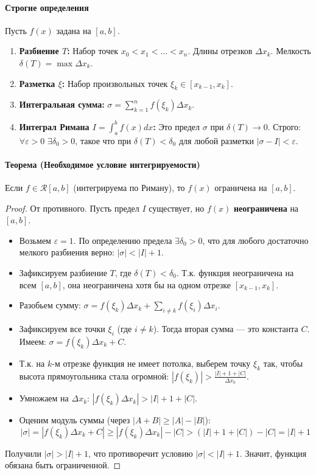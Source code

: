 \paragraph{Строгие определения}
Пусть $f(x)$ задана на $[a, b]$. 
\begin{enumerate}
    \item \textbf{Разбиение $T$:} Набор точек $x_0 < x_1 < \dots < x_n$. Длины отрезков $\Delta x_k$. Мелкость $\delta(T) = \max \Delta x_k$.
    \item \textbf{Разметка $\xi$:} Набор произвольных точек $\xi_k \in [x_{k-1}, x_k]$.
    \item \textbf{Интегральная сумма:} $\sigma = \sum_{k=1}^n f(\xi_k) \Delta x_k$.
    \item \textbf{Интеграл Римана $I = \int_a^b f(x) dx$:} Это предел $\sigma$ при $\delta(T) \to 0$. Строго: $\forall \varepsilon > 0 \,\, \exists \delta_0 > 0$, такое что при $\delta(T) < \delta_0$ для любой разметки $|\sigma - I| < \varepsilon$.
\end{enumerate}

\paragraph{Теорема (Необходимое условие интегрируемости)}
\begin{theorem}
Если $f \in \mathcal{R}[a, b]$ (интегрируема по Риману), то $f(x)$ ограничена на $[a, b]$.
\end{theorem}

\begin{proof}
От противного. Пусть предел $I$ существует, но $f(x)$ \textbf{неограничена} на $[a, b]$.
\begin{itemize}
    \item Возьмем $\varepsilon = 1$. По определению предела $\exists \delta_0 > 0$, что для любого достаточно мелкого разбиения верно: $|\sigma| < |I| + 1$.
    \item Зафиксируем разбиение $T$, где $\delta(T) < \delta_0$. Т.к. функция неограничена на всем $[a, b]$, она неограничена хотя бы на одном отрезке $[x_{k-1}, x_k]$.
    \item Разобьем сумму: $\sigma = f(\xi_k)\Delta x_k + \sum_{i \neq k} f(\xi_i)\Delta x_i$.
    \item Зафиксируем все точки $\xi_i$ (где $i \neq k$). Тогда вторая сумма — это константа $C$. Имеем: $\sigma = f(\xi_k)\Delta x_k + C$.
    \item Т.к. на $k$-м отрезке функция не имеет потолка, выберем точку $\xi_k$ так, чтобы высота прямоугольника стала огромной: $|f(\xi_k)| > \frac{|I| + 1 + |C|}{\Delta x_k}$.
    \item Умножаем на $\Delta x_k$: \quad $|f(\xi_k)\Delta x_k| > |I| + 1 + |C|$.
    \item Оценим модуль суммы (через $|A+B| \ge |A|-|B|$): 
    $$ |\sigma| = |f(\xi_k)\Delta x_k + C| \ge |f(\xi_k)\Delta x_k| - |C| > (|I| + 1 + |C|) - |C| = |I| + 1 $$
\end{itemize}
Получили $|\sigma| > |I| + 1$, что противоречит условию $|\sigma| < |I| + 1$. Значит, функция обязана быть ограниченной.
\end{proof}

